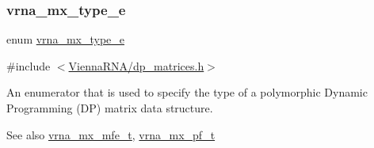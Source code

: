 \subsubsection{\texorpdfstring{vrna\+\_\+mx\+\_\+type\+\_\+e}{vrna\_mx\_type\_e}}
{\footnotesize\ttfamily enum \hyperlink{group__dp__matrices_ga6042ea1d58d01931e959791be6d89343}{vrna\+\_\+mx\+\_\+type\+\_\+e}}



{\ttfamily \#include $<$\hyperlink{dp__matrices_8h}{Vienna\+R\+N\+A/dp\+\_\+matrices.\+h}$>$}



An enumerator that is used to specify the type of a polymorphic Dynamic Programming (DP) matrix data structure. 

\begin{DoxySeeAlso}{See also}
\hyperlink{group__dp__matrices_gae5aef35d016475e758f619b7bcb534f9}{vrna\+\_\+mx\+\_\+mfe\+\_\+t}, \hyperlink{group__dp__matrices_ga68729ab3fed26bdd1806fa814f172fc1}{vrna\+\_\+mx\+\_\+pf\+\_\+t} 
\end{DoxySeeAlso}
